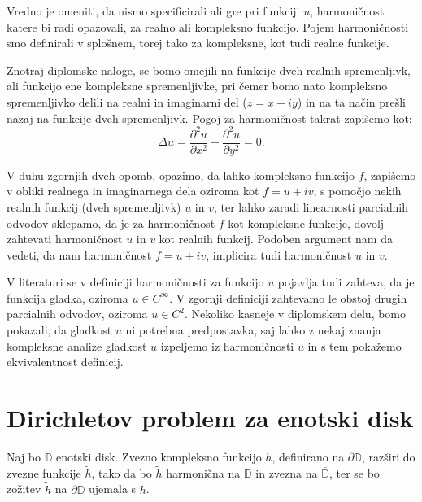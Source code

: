 \documentclass[mat1]{fmfdelo}
\begin{document}
    \begin{opomba}
        Vredno je omeniti, da nismo specificirali ali gre pri funkciji $u$, harmoničnost katere bi radi opazovali, za realno ali kompleksno funkcijo. 
        Pojem harmoničnosti smo definirali v splošnem, torej tako za kompleksne, kot tudi realne funkcije.
    \end{opomba}

    \begin{opomba}
        Znotraj diplomske naloge, se bomo omejili na funkcije dveh realnih spremenljivk, ali funkcijo ene kompleksne spremenljivke, pri čemer bomo nato kompleksno spremenljivko delili na realni in imaginarni del ($z = x + iy $) in na ta način prešli nazaj na funkcije dveh spremenljivk.
        \newline
        Pogoj za harmoničnost takrat zapišemo kot: 
            $$
                \Delta u = \frac{\partial^2 u}{\partial x ^ 2} +  \frac{\partial^2 u}{\partial y ^ 2}= 0.
            $$
    \end{opomba}
    V duhu zgornjih dveh opomb, opazimo, da lahko kompleksno funkcijo $f$, zapišemo v obliki realnega in imaginarnega dela oziroma kot $f = u + i v$, s pomočjo nekih realnih funkcij (dveh spremenljivk) $u$ in $v$, ter lahko zaradi linearnosti parcialnih odvodov sklepamo, da je za harmoničnost $f$ kot kompleksne funkcije, dovolj zahtevati harmoničnost $u$ in $v$ kot realnih funkcij.
    Podoben argument nam da vedeti, da nam harmoničnost $f = u + iv$, implicira tudi harmoničnost $u$ in $v$. 

    \begin{opomba}
        V literaturi se v definiciji harmoničnosti za funkcijo $u$ pojavlja tudi zahteva, da je funkcija gladka, oziroma $u \in C^{\infty}$. V zgornji definiciji zahtevamo le obstoj drugih parcialnih odvodov, oziroma $u \in C^2$. 
        Nekoliko kasneje v diplomskem delu, bomo pokazali, da gladkost $u$ ni potrebna predpostavka, saj lahko z nekaj znanja kompleksne analize gladkost $u$ izpeljemo iz harmoničnosti $u$ in s tem pokažemo ekvivalentnost definicij. 
    \end{opomba}


\section{Dirichletov problem za enotski disk}
    \begin{pro}
        Naj bo $\mathbb{D}$ enotski disk. Zvezno kompleksno funkcijo $h$, definirano na $\partial \mathbb{D}$, razširi do zvezne funkcije $\widetilde{h}$, tako da bo $\widetilde{h}$ harmonična na $\mathbb{D}$ in zvezna na $\overline{\mathbb{D}}$, ter se bo zožitev $\widetilde{h}$ na $\partial \mathbb{D}$ ujemala s $h$.
    \end{pro}
\end{document}
